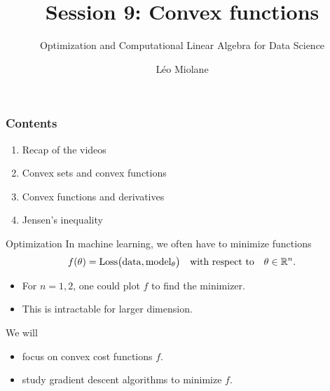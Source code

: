 \documentclass{beamer}
\title{Session 9: Convex functions}
\subtitle{Optimization and Computational Linear Algebra for Data Science}
\author{Léo Miolane}
\date{}
\begin{document}
\setcounter{showProgressBar}{0}
\setcounter{showSlideNumbers}{0}

\frame{\titlepage}
\setcounter{framenumber}{0}
\setcounter{showSlideNumbers}{1}

\begin{frame}
	\frametitle{Contents}
	\begin{enumerate}
		\item Recap of the videos
		\item Convex sets and convex functions
		\item Convex functions and derivatives
		\item Jensen's inequality
	\end{enumerate}
\end{frame}
\begin{frame}[t]{Optimization}
	In machine learning, we often have to minimize functions
	$$
	f(\theta) = {\rm Loss}\big( {\rm data}, {\rm model}_{\theta}\big)
	\quad \text{with respect to} \quad \theta \in \mathbb{R}^n.
	$$
	\begin{itemize}
		\item For $n=1,2$, one could plot $f$ to find the minimizer.
		\item This is intractable for larger dimension.
	\end{itemize}

	\vspace{0.2cm}
	\begin{block}{We will}
		\begin{itemize}
			\item focus on convex cost functions $f$.
			\item study gradient descent algorithms to minimize $f$.
		\end{itemize}
	\end{block}
\end{frame}
\end{document}
